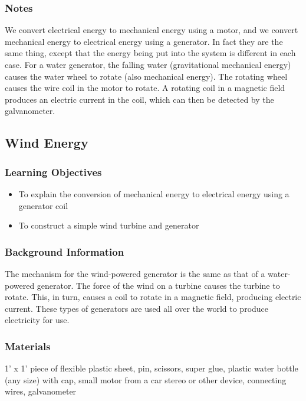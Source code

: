 \subsubsection*{Notes}
We convert electrical energy to mechanical energy using a motor, and we convert mechanical energy to electrical energy using a generator. In fact they are the same thing, except that the energy being put into the system is different in each case.  
For a water generator, the falling water (gravitational mechanical energy) causes the water wheel to rotate (also mechanical energy). The rotating wheel causes the wire coil in the motor to rotate. A rotating coil in a magnetic field produces an electric current in the coil, which can then be detected by the galvanometer.  

\subsection{Wind Energy}

\subsubsection*{Learning Objectives}
\begin{itemize}
\item{To explain the conversion of mechanical energy to electrical energy using a generator coil} 
\item{To construct a simple wind turbine and generator} 
\end{itemize}

\subsubsection*{Background Information}
The mechanism for the wind-powered generator is the same as that of a water-powered generator.  The force of the wind on a turbine causes the turbine to rotate.  This, in turn, causes a coil to rotate in a magnetic field, producing electric current.  These types of generators are used all over the world to produce electricity for use.

\subsubsection*{Materials}
1' x 1' piece of flexible plastic sheet, pin, scissors, super glue, plastic water bottle (any size) with cap, small motor from a car stereo or other device, connecting wires, galvanometer

